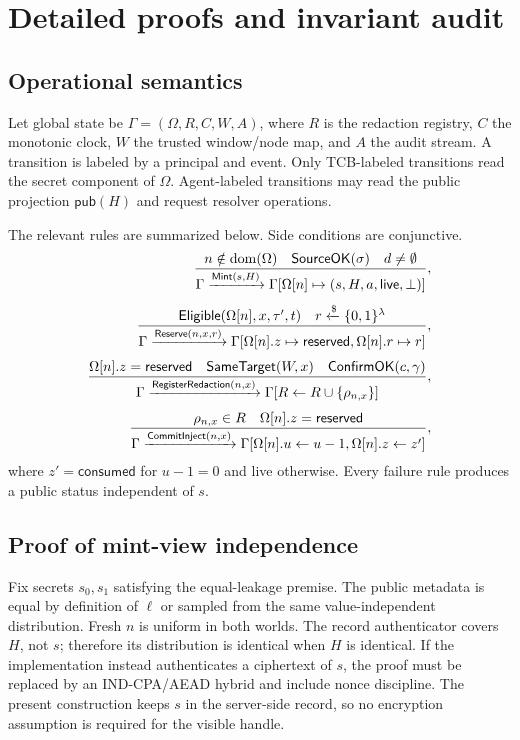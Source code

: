 \section{Detailed proofs and invariant audit}
\label{app:proofs}

\subsection{Operational semantics}

Let global state be $\Gamma=(\Omega,R,C,W,A)$, where $R$ is the redaction registry, $C$ the monotonic clock, $W$ the trusted window/node map, and $A$ the audit stream. A transition is labeled by a principal and event. Only TCB-labeled transitions read the secret component of $\Omega$. Agent-labeled transitions may read the public projection $\mathsf{pub}(H)$ and request resolver operations.

The relevant rules are summarized below. Side conditions are conjunctive.
\begin{align*}
\frac{n\notin\mathrm{dom}(\Omega)\quad \mathsf{SourceOK}(\sigma)\quad d\ne\emptyset}
{\Gamma\xrightarrow{\mathsf{Mint}(s,H)}\Gamma[\Omega[n]\mapsto(s,H,a,\mathsf{live},\bot)]},\\[4pt]
\frac{\mathsf{Eligible}(\Omega[n],x,\tau',t)\quad r\xleftarrow{\$}\{0,1\}^\lambda}
{\Gamma\xrightarrow{\mathsf{Reserve}(n,x,r)}\Gamma[\Omega[n].z\mapsto\mathsf{reserved},\Omega[n].r\mapsto r]},\\[4pt]
\frac{\Omega[n].z=\mathsf{reserved}\quad \mathsf{SameTarget}(W,x)\quad \mathsf{ConfirmOK}(c,\gamma)}
{\Gamma\xrightarrow{\mathsf{RegisterRedaction}(n,x)}\Gamma[R\leftarrow R\cup\{\rho_{n,x}\}]},\\[4pt]
\frac{\rho_{n,x}\in R\quad \Omega[n].z=\mathsf{reserved}}
{\Gamma\xrightarrow{\mathsf{CommitInject}(n,x)}\Gamma[\Omega[n].u\leftarrow u-1,\Omega[n].z\leftarrow z']},
\end{align*}
where $z'=\mathsf{consumed}$ for $u-1=0$ and live otherwise. Every failure rule produces a public status independent of $s$.

\subsection{Proof of mint-view independence}

Fix secrets $s_0,s_1$ satisfying the equal-leakage premise. The public metadata is equal by definition of $\ell$ or sampled from the same value-independent distribution. Fresh $n$ is uniform in both worlds. The record authenticator covers $H$, not $s$; therefore its distribution is identical when $H$ is identical. If the implementation instead authenticates a ciphertext of $s$, the proof must be replaced by an IND-CPA/AEAD hybrid and include nonce discipline. The present construction keeps $s$ in the server-side record, so no encryption assumption is required for the visible handle.

